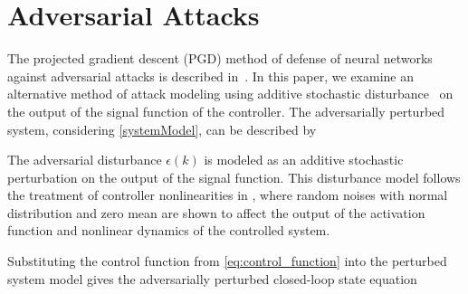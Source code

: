 \section{Adversarial Attacks}

The projected gradient descent (PGD) method of defense of neural networks
against adversarial attacks is described
in~\cite{madry2019deeplearningmodelsresistant}. In this paper, we examine
an alternative method of attack modeling using additive stochastic
disturbance~\cite{Hajari2023} on the output of the signal function of the controller.
The adversarially perturbed system, considering \eqref{systemModel}, can be described by


The adversarial disturbance $\epsilon(k)$ is modeled as an additive stochastic perturbation
on the output of the signal function. This disturbance model follows the treatment of
controller nonlinearities in \cite{tymoshchuk2023nnoptimal}, where random noises
with normal distribution and zero mean are shown to affect the output of the activation
function and nonlinear dynamics of the controlled system.

Substituting the control function from \eqref{eq:control_function}
into the perturbed system model gives the adversarially perturbed closed-loop state
equation



